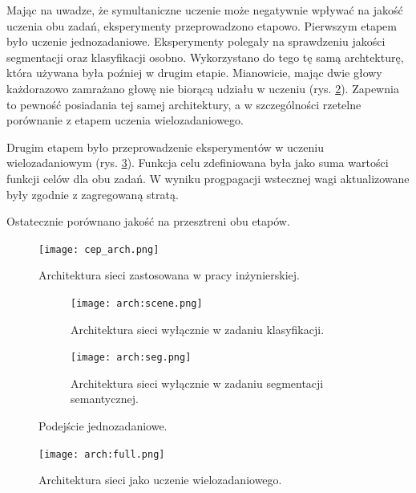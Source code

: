 Mając na uwadze, że symultaniczne uczenie może negatywnie wpływać na jakość uczenia obu zadań, eksperymenty przeprowadzono etapowo. Pierwszym etapem było uczenie jednozadaniowe. Eksperymenty polegały na sprawdzeniu jakości segmentacji oraz klasyfikacji osobno. Wykorzystano do tego tę samą archtekturę, która używana była poźniej w drugim etapie. Mianowicie, mając dwie głowy każdorazowo zamrażano głowę nie biorącą udziału w uczeniu (rys. \ref{fig:arch-scene-seg}). Zapewnia to pewność posiadania tej samej architektury, a w szczególności rzetelne porównanie z etapem uczenia wielozadaniowego.

Drugim etapem było przeprowadzenie eksperymentów w uczeniu wielozadaniowym (rys. \ref{fig:arch-full}). Funkcja celu zdefiniowana była jako suma wartości funkcji celów dla obu zadań. W wyniku progpagacji wstecznej wagi aktualizowane były zgodnie z zagregowaną stratą.

Ostatecznie porównano jakość na przesztreni obu etapów.

\begin{figure}[ht!]
    \centering
    \texttt{[image: cep\_arch.png]}
    \caption{Architektura sieci zastosowana w pracy inżynierskiej.}
    \label{fig:cep_arch}
\end{figure}

\begin{figure}[ht!]
    \centering
    \begin{subfigure}[b]{0.49\textwidth}
        \centering
        \texttt{[image: arch:scene.png]}
        \caption{Architektura sieci wyłącznie w zadaniu klasyfikacji.}
    \end{subfigure}
    \hfill
    \begin{subfigure}[b]{0.49\textwidth}
        \centering
        \texttt{[image: arch:seg.png]}
        \caption{Architektura sieci wyłącznie w zadaniu segmentacji semantycznej.}
    \end{subfigure}
    \caption[]{Podejście jednozadaniowe.}
    \label{fig:arch-scene-seg}
\end{figure}

\begin{figure}[ht!]
    \centering
    \texttt{[image: arch:full.png]}
    \caption{Architektura sieci jako uczenie wielozadaniowego.}
    \label{fig:arch-full}
\end{figure}